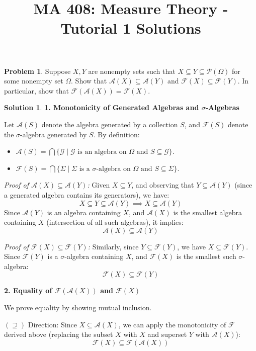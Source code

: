 \documentclass{article}
\title{MA 408: Measure Theory - Tutorial 1 Solutions}
\author{}
\date{}
\theoremstyle{definition}
\newtheorem{problem}{Problem}
\newtheorem*{solution}{Solution}
\begin{document}
\maketitle

\begin{problem}
Suppose $X, Y$ are nonempty sets such that $X \subseteq Y \subseteq \mathcal{P}(\Omega)$ for some nonempty set $\Omega$. Show that $\mathcal{A}(X) \subseteq \mathcal{A}(Y)$ and $\mathcal{F}(X) \subseteq \mathcal{F}(Y)$. In particular, show that $\mathcal{F}(\mathcal{A}(X)) = \mathcal{F}(X)$.
\end{problem}

\begin{solution}
\textbf{1. Monotonicity of Generated Algebras and $\sigma$-Algebras}

Let $\mathcal{A}(S)$ denote the algebra generated by a collection $S$, and $\mathcal{F}(S)$ denote the $\sigma$-algebra generated by $S$. By definition:
\begin{itemize}
    \item $\mathcal{A}(S) = \bigcap \{ \mathcal{G} \mid \mathcal{G} \text{ is an algebra on } \Omega \text{ and } S \subseteq \mathcal{G} \}$.
    \item $\mathcal{F}(S) = \bigcap \{ \Sigma \mid \Sigma \text{ is a } \sigma\text{-algebra on } \Omega \text{ and } S \subseteq \Sigma \}$.
\end{itemize}

\textit{Proof of $\mathcal{A}(X) \subseteq \mathcal{A}(Y)$:}
Given $X \subseteq Y$, and observing that $Y \subseteq \mathcal{A}(Y)$ (since a generated algebra contains its generators), we have:
\[ X \subseteq Y \subseteq \mathcal{A}(Y) \implies X \subseteq \mathcal{A}(Y) \]
Since $\mathcal{A}(Y)$ is an algebra containing $X$, and $\mathcal{A}(X)$ is the smallest algebra containing $X$ (intersection of all such algebras), it implies:
\[ \mathcal{A}(X) \subseteq \mathcal{A}(Y) \]

\textit{Proof of $\mathcal{F}(X) \subseteq \mathcal{F}(Y)$:}
Similarly, since $Y \subseteq \mathcal{F}(Y)$, we have $X \subseteq \mathcal{F}(Y)$. Since $\mathcal{F}(Y)$ is a $\sigma$-algebra containing $X$, and $\mathcal{F}(X)$ is the smallest such $\sigma$-algebra:
\[ \mathcal{F}(X) \subseteq \mathcal{F}(Y) \]

\textbf{2. Equality of $\mathcal{F}(\mathcal{A}(X))$ and $\mathcal{F}(X)$}

We prove equality by showing mutual inclusion.

$(\supseteq)$ Direction:
Since $X \subseteq \mathcal{A}(X)$, we can apply the monotonicity of $\mathcal{F}$ derived above (replacing the subset $X$ with $X$ and superset $Y$ with $\mathcal{A}(X)$):
\[ \mathcal{F}(X) \subseteq \mathcal{F}(\mathcal{A}(X)) \]


\end{solution}
\end{document}
